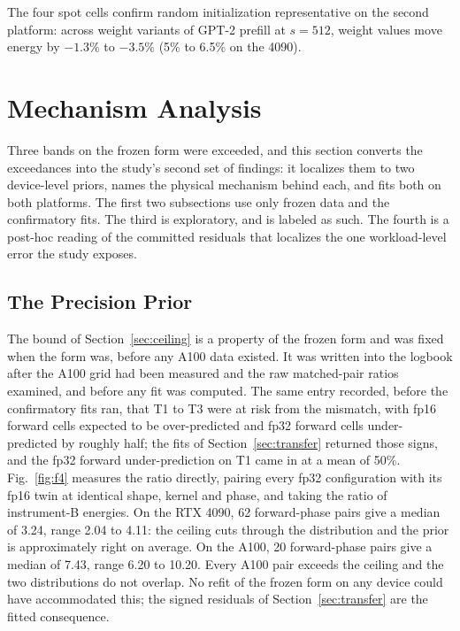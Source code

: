 \documentclass[conference]{IEEEtran}
\begin{document}
The four spot cells confirm random initialization representative on the
second platform: across weight variants of GPT-2 prefill at $s=512$, weight
values move energy by $-1.3\%$ to $-3.5\%$ (5\% to 6.5\% on the 4090).

\section{Mechanism Analysis}
\label{sec:mechanism}

Three bands on the frozen form were exceeded, and this section converts the
exceedances into the study's second set of findings: it localizes them to
two device-level priors, names the physical mechanism behind each, and fits
both on both platforms. The first two subsections use only frozen data and
the confirmatory fits. The third is exploratory, and is labeled as such.
The fourth is a post-hoc reading of the committed residuals that localizes
the one workload-level error the study exposes.

\subsection{The Precision Prior}
\label{sec:precision}

The bound of Section~\ref{sec:ceiling} is a property of the frozen form and
was fixed when the form was, before any A100 data existed. It was written
into the logbook after the A100 grid had been measured and the raw
matched-pair ratios examined, and before any fit was computed. The same
entry recorded, before the confirmatory fits ran, that T1 to T3 were at
risk from the mismatch, with fp16 forward cells expected to be
over-predicted and fp32 forward cells under-predicted by roughly half; the
fits of Section~\ref{sec:transfer} returned those signs, and the fp32
forward under-prediction on T1 came in at a mean of 50\%.
Fig.~\ref{fig:f4} measures the ratio directly, pairing every fp32
configuration with its fp16 twin at identical shape, kernel and phase, and
taking the ratio of instrument-B energies. On the RTX 4090, 62 forward-phase
pairs give a median of 3.24, range 2.04 to 4.11: the ceiling cuts through
the distribution and the prior is approximately right on average. On the
A100, 20 forward-phase pairs give a median of 7.43, range 6.20 to 10.20.
Every A100 pair exceeds the ceiling and the two distributions do not
overlap. No refit of the frozen form on any device could have accommodated
this; the signed residuals of Section~\ref{sec:transfer} are the fitted
consequence.
\end{document}

